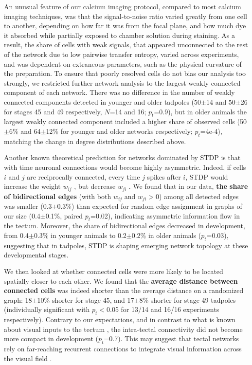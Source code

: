 \documentclass{article}
\begin{document}
An unusual feature of our calcium imaging protocol, compared to most calcium imaging techniques, was that the signal-to-noise ratio varied greatly from one cell to another, depending on how far it was from the focal plane, and how much dye it absorbed while partially exposed to chamber solution during staining. As a result, the share of cells with weak signals, that appeared unconnected to the rest of the network due to low pairwise transfer entropy, varied across experiments, and was dependent on extraneous parameters, such as the physical curvature of the preparation. To ensure that poorly resolved cells do not bias our analysis too strongly, we restricted further network analysis to the largest weakly connected component of each network. There was no difference in the number of weakly connected components detected in younger and older tadpoles (50$\pm$14 and 50$\pm$26 for stages 45 and 49 respectively, $N$=14 and 16; $p_t$=0.9), but in older animals the largest weakly connected component included a higher share of observed cells (50$\pm$6\% and 64$\pm$12\% for younger and older networks respectively; $p_t$=4e-4), matching the change in degree distributions described above.

Another known theoretical prediction for networks dominated by STDP \citep{mu2006stdp,pratt2008recurrent} is that with time neuronal connections would become highly asymmetric. Indeed, if cells $i$ and $j$ are reciprocally connected, every time $j$ spikes after $i$, STDP would increase the weight $w_{ij}$ , but decrease $w_{ji}$ \citep{abbott1996ltpsequence,fiete2010chains}. We found that in our data, \textbf{the share of bidirectional edges} (with both $w_{ij}$ and $w_{ji}>$0) among all detected edges was smaller (0.3$\pm$0.3\%) than expected for random edge assignment in graphs of our size (0.4$\pm$0.1\%, paired $p_t$=0.02), indicating asymmetric information flow in the tectum. Moreover, the share of bidirectional edges decreased in development, from 0.4$\pm$0.3\% in younger animals to 0.2$\pm$0.2\% in older animals ($p_t$=0.03), suggesting that in tadpoles, STDP is shaping emerging network topology at these developmental stages.

We then looked at whether connected cells were more likely to be located spatially closer to each other. We found that the \textbf{average distance between connected cells} was indeed shorter than the average distance on a randomized graph: 18$\pm$10\% shorter for stage 45, and 17$\pm$8\% shorter for stage 49 tadpoles (individually significant with $p_t<$0.05 for 13/14 and 16/16 experiments respectively). Contrary to our expectations, and in contrast to what is known about visual inputs to the tectum \citep{tao2005refinement}, the intra-tectal connectivity did not become more compact in development ($p_t$=0.7). This may suggest that tectal networks rely on far-reaching recurrent connections to integrate visual information across the visual field \citep{baginskas2009recurrent,liu2016jumbo,jang2016}.
\end{document}
